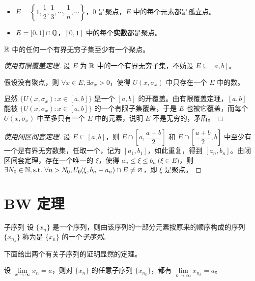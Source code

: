 \begin{itemize}
	\item $E = \left\{1, \dfrac{1}{2}, \dfrac{1}{3}, \cdots, \dfrac{1}{n}, \cdots \right\}$，$0$ 是聚点，$E$ 中的每个元素都是孤立点。
	\item $E = [0, 1] \cap \mathbb Q$，$[0, 1]$ 中的每个\textbf{实数}都是聚点。
\end{itemize}

\begin{theorem}[聚点原理]
	$\mathbb R$ 中的任何一个有界无穷子集至少有一个聚点。
\end{theorem}

\begin{proof}[使用有限覆盖定理]
	设 $E$ 为 $\mathbb R$ 中的一个有界无穷子集，不妨设 $E \subseteq [a, b]$。

	假设没有聚点，则 $\forall x \in E, \exists \sigma_x > 0$，使得 $U(x, \sigma_x)$ 中只存在一个 $E$ 中的数。

	显然 $\{U(x, \sigma_x): x \in [a, b]\}$ 是一个 $[a, b]$ 的开覆盖。由有限覆盖定理，$[a, b]$ 能被 $\{U(x, \sigma_x): x \in [a, b]\}$ 的一个有限子集覆盖，于是 $E$ 也被它覆盖，而每个 $U(x, \sigma_x)$ 中至多只有一个 $E$ 中的元素，说明 $E$ 不是无穷的，矛盾。
\end{proof}

\begin{proof}[使用闭区间套定理]
	设 $E \subseteq [a, b]$，则 $E \cap \left[ a, \dfrac{a + b}{2} \right]$ 和 $E \cap \left[ \dfrac{a + b}{2}, b \right]$ 中至少有一个是有界无穷数集，任取一个，记为 $[a_1, b_1]$，如此重复，得到 $[a_n, b_n]$。由闭区间套定理，存在一个唯一的 $\xi$，使得 $a_n \le \xi \le b_n \pod{\xi \in E}$，则 $\exists N_0 \in \mathbb N, \text{s.t.~} \forall n > N_0, U_0(\xi, b_n - a_n) \cap E \ne \varnothing$，即 $\xi$ 是聚点。
\end{proof}

\section{BW 定理}

\begin{definition}{子序列}
	设 $\{x_n\}$ 是一个序列，则由该序列的一部分元素按原来的顺序构成的序列 $\{x_{n_k}\}$ 称为是 $\{x_n\}$ 的一个\emph{子序列}。
\end{definition}

下面给出两个有关子序列的证明显然的定理。

\begin{theorem}
	设 $\lim\limits_{x \rightarrow \infty} x_n = a$，则对 $\{x_n\}$ 的任意子序列 $\{x_{n_k}\}$，都有 $\lim\limits_{k \rightarrow \infty} x_{n_k} = a$。
\end{theorem}


